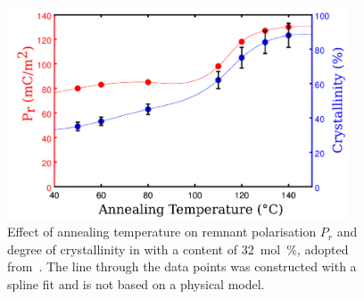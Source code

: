 \begin{figure}[h]
\centering
	\includegraphics[width=0.9\textwidth]{./figs/chap1/annealtemp}
	\caption[Effect of annealing temperature on remnant polarisation $P_r$ and degree of crystallinity in \pvfe{} with a \trfe{} content of \SI{32}{\mole\percent}.]{Effect of annealing temperature on remnant polarisation $P_r$ and degree of crystallinity in \pvfe{} with a \trfe{} content of \SI{32}{\mole\percent}, adopted from~\cite[p. 813]{encyclopedia}. The line through the data points was constructed with a spline fit and is not based on a physical model.}
	\label{fig:annealtemp}
\end{figure}

